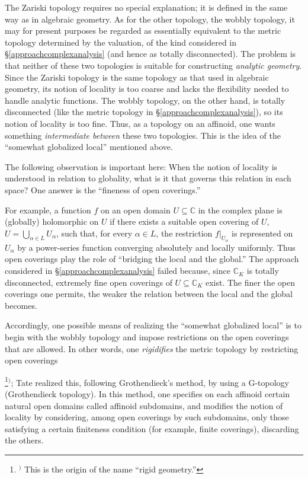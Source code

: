 \documentclass[a4paper,12pt, dvipdfmx]{jsbook}
\def\C{\mathbb{C}}
\theoremstyle{plain}
\theoremstyle{definition}
\newcounter{chushaku}
\def\chu#1{\addtocounter{chushaku}{1}\footnote[\value{chushaku}]{${}^)$ #1}${}^)$}
\begin{document}
The Zariski topology requires no special explanation; it is defined in the same way as in algebraic geometry.
As for the other topology, the wobbly topology, it may for present purposes be regarded as essentially equivalent to the metric topology determined by the valuation, of the kind considered in \S\ref{approachcomplexanalysis} (and hence as totally disconnected).
The problem is that neither of these two topologies is suitable for constructing {\it analytic geometry}.
Since the Zariski topology is the same topology as that used in algebraic geometry, its notion of locality is too coarse and lacks the flexibility needed to handle analytic functions.
The wobbly topology, on the other hand, is totally disconnected (like the metric topology in \S\ref{approachcomplexanalysis}), so its notion of locality is too fine.
Thus, as a topology on an affinoid, one wants something {\it intermediate between} these two topologies.
This is the idea of the ``somewhat globalized local'' mentioned above.

The following observation is important here:
When the notion of locality is understood in relation to globality, what is it that governs this relation in each space?
One answer is the ``fineness of open coverings.''

For example, a function $f$ on an open domain $U\subseteq\C$ in the complex plane is (globally) holomorphic on $U$ if there exists a suitable open covering of $U$, $U=\bigcup_{\alpha\in L}U_{\alpha}$, such that, for every $\alpha\in L$, the restriction $f|_{U_{\alpha}}$ is represented on $U_{\alpha}$ by a power-series function converging absolutely and locally uniformly.
Thus open coverings play the role of ``bridging the local and the global.''
The approach considered in \S\ref{approachcomplexanalysis} failed because, since $\C_K$ is totally disconnected, extremely fine open coverings of $U\subseteq\C_K$ exist.
The finer the open coverings one permits, the weaker the relation between the local and the global becomes.

Accordingly, one possible means of realizing the ``somewhat globalized local'' is to begin with the wobbly topology and impose restrictions on the open coverings that are allowed.
In other words, one {\it rigidifies} the metric topology by restricting open coverings\chu{This is the origin of the name ``rigid geometry.''}; Tate realized this, following Grothendieck's method, by using a G-topology (Grothendieck topology).
In this method, one specifies on each affinoid certain natural open domains called affinoid subdomains, and modifies the notion of locality by considering, among open coverings by such subdomains, only those satisfying a certain finiteness condition (for example, finite coverings), discarding the others.
\end{document}
